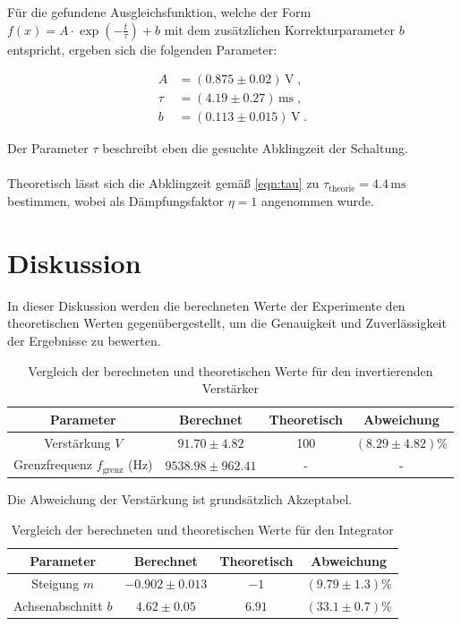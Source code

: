 \documentclass[12pt]{article}
\begin{document}
Für die gefundene Ausgleichsfunktion, welche der Form $f(x) = A \cdot \exp\left(-\frac{t}{\tau}\right) + b$ mit dem zusätzlichen Korrekturparameter $b$ entspricht, ergeben sich die folgenden Parameter:


\begin{align*}
    A &= (0.875 \pm 0.02)\,\unit{\volt} \;,\\
    \tau &= (4.19 \pm 0.27)\,\unit{\milli\second} \;,\\
    b &= (0.113 \pm 0.015)\,\unit{\volt} \;.
\end{align*}

Der Parameter $\tau$ beschreibt eben die gesuchte Abklingzeit der Schaltung.\\
\\
Theoretisch lässt sich die Abklingzeit gemäß \autoref{eqn:tau} zu $\tau_\text{theorie} = 4.4\,\unit{\milli\second}$ bestimmen, wobei als Dämpfungsfaktor $\eta = 1$ angenommen wurde.

\section{Diskussion}\label{sec:diskussion}

In dieser Diskussion werden die berechneten Werte der Experimente den theoretischen Werten gegenübergestellt, um die Genauigkeit und Zuverlässigkeit der Ergebnisse zu bewerten.

\begin{table}[H]
  \centering
  \caption{Vergleich der berechneten und theoretischen Werte für den invertierenden Verstärker}
  \begin{tabular}{c | c c | c}
  \toprule
  Parameter & Berechnet & Theoretisch & Abweichung \\
  \midrule
  Verstärkung $V$ & $91.70 \pm 4.82$ & 100 & $(8.29\pm4.82)$\%\\
  Grenzfrequenz $f_\text{grenz}$ (Hz) & $9538.98 \pm 962.41$ & - & - \\
  \bottomrule
  \end{tabular}
  \label{tab:inv_verstarker}
\end{table}

Die Abweichung der Verstärkung ist grundsätzlich Akzeptabel.

\begin{table}[H]
  \centering
  \caption{Vergleich der berechneten und theoretischen Werte für den Integrator}
  \begin{tabular}{c | c c | c}
  \toprule
  Parameter & Berechnet & Theoretisch & Abweichung \\
  \midrule
  Steigung $m$ & $-0.902 \pm 0.013$ & $-1$ & $(9.79\pm1.3)$\%\\
  Achsenabschnitt $b$ & $4.62 \pm 0.05$ & $6.91$ & $(33.1\pm0.7)$\%\\
  \bottomrule
  \end{tabular}
  \label{tab:integrator}
\end{table}
\end{document}
